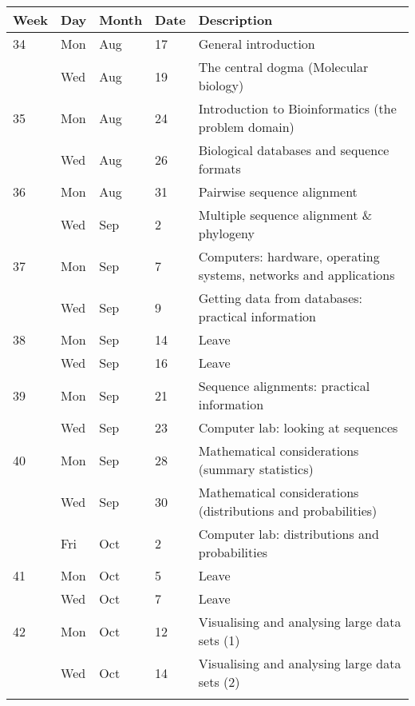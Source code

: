 

\begin{tabu}{ l l l l| l}
  Week & Day & Month & Date & Description \\
  \hline
  34 & Mon & Aug & 17 & General introduction \\
  & Wed & Aug & 19 & The central dogma (Molecular biology) \\
  35 & Mon & Aug & 24 & Introduction to Bioinformatics (the problem domain) \\
  & Wed & Aug & 26 & Biological databases and sequence formats \\
  36 & Mon & Aug & 31 & Pairwise sequence alignment \\
  & Wed & Sep & 2 & Multiple sequence alignment \& phylogeny \\
  37 & Mon & Sep & 7 & Computers: hardware, operating systems, networks and applications \\
  & Wed & Sep & 9 &  Getting data from databases: practical information \\
  38 & Mon & Sep & 14 & Leave \\
  & Wed & Sep & 16 & Leave \\
  39 & Mon & Sep & 21 & Sequence alignments: practical information \\
  \rowfont{\color{blue!100}}
  & Wed & Sep & 23 & Computer lab: looking at sequences \\
  40 & Mon & Sep & 28 & Mathematical considerations (summary statistics) \\
  & Wed & Sep & 30 & Mathematical considerations (distributions and probabilities) \\
  \rowfont{\color{blue!100}}  
  & Fri & Oct & 2 & Computer lab: distributions and probabilities \\
  41 & Mon & Oct & 5 & Leave \\
  & Wed & Oct & 7 & Leave \\
  42 & Mon & Oct & 12 & Visualising and analysing large data sets (1) \\
  & Wed & Oct & 14 & Visualising and analysing large data sets (2) \\
  \rowfont{\color{blue!100}}  

\end{tabu}
